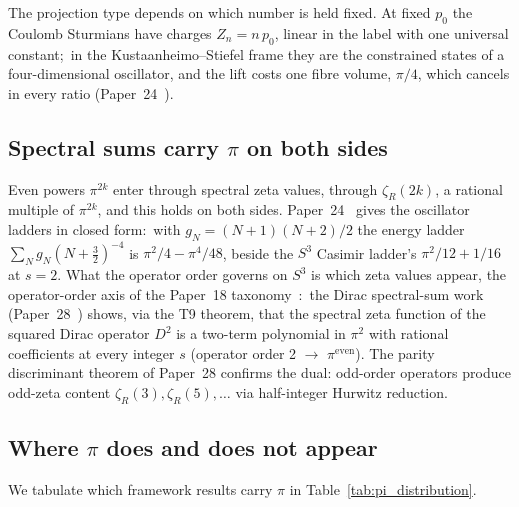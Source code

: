 \documentclass[twocolumn,pra,amsmath,amssymb,superscriptaddress]{revtex4-2}
\begin{document}
The projection type depends on which number is held fixed.  At fixed
$p_0$ the Coulomb Sturmians have charges $Z_n = n\,p_0$, linear in the
label with one universal constant;\ in the Kustaanheimo--Stiefel frame
they are the constrained states of a four-dimensional oscillator, and
the lift costs one fibre volume, $\pi/4$, which cancels in every ratio
(Paper~24~\cite{paper24}).

\subsection{Spectral sums carry $\pi$ on both sides}

Even powers $\pi^{2k}$ enter through spectral zeta values, through
$\zeta_R(2k)$, a rational multiple of $\pi^{2k}$, and this holds on
both sides.
Paper~24~\cite{paper24} gives the oscillator ladders in closed form:\
with $g_N = (N+1)(N+2)/2$ the energy ladder
$\sum_N g_N (N + \tfrac32)^{-4}$ is $\pi^2/4 - \pi^4/48$, beside the
$S^3$ Casimir ladder's $\pi^2/12 + 1/16$ at $s = 2$.  What the operator
order governs on $S^3$ is which zeta values appear, the operator-order
axis of the Paper~18 taxonomy~\cite{paper18}:\ the Dirac spectral-sum work
(Paper~28~\cite{paper28}) shows, via the T9 theorem, that the
spectral zeta function of the squared Dirac operator $D^2$ is a
two-term polynomial in $\pi^2$ with rational coefficients at every
integer $s$ (operator order 2 $\to$ $\pi^{\mathrm{even}}$).  The
parity discriminant theorem of Paper~28 confirms the dual: odd-order
operators produce odd-zeta content $\zeta_R(3), \zeta_R(5), \ldots$
via half-integer Hurwitz reduction.

\subsection{Where $\pi$ does and does not appear}

We tabulate which framework results carry $\pi$ in
Table~\ref{tab:pi_distribution}.
\end{document}
